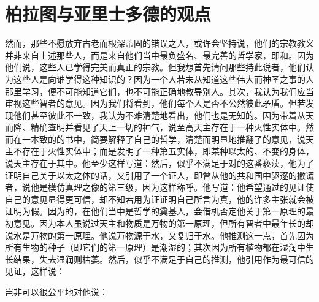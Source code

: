 
\section{柏拉图与亚里士多德的观点}

然而，那些不愿放弃古老而根深蒂固的错误之人，或许会坚持说，他们的宗教教义并非来自上述那些人，而是来自他们当中最负盛名、最完善的哲学家，即和。因为他们说，这些人已学得完美而真正的宗教。但我想首先请问那些持此说者，他们认为这些人是向谁学得这种知识的？因为一个人若未从知道这些伟大而神圣之事的人那里学习，便不可能知道它们，也不可能正确地教导别人。其次，我认为我们应当审视这些智者的意见。因为我们将看到，他们每个人是否不公然彼此矛盾。但若发现他们甚至彼此不一致，我认为不难清楚地看出，他们也是无知的。因为带着从天而降、精确查明并看见了天上一切的神气，说至高天主存在于一种火性实体中。然而在一本致的的书中，简要解释了自己的哲学，清楚而明显地推翻了的意见，说天主不存在于火性实体中；而是发明了一种第五实体，即某种以太的、不变的身体，说天主存在于其中。他至少这样写道：然后，似乎不满足于对的这番亵渎，他为了证明自己关于以太之体的话，又引用了一个证人，即曾从他的共和国中驱逐的撒谎者，说他是模仿真理之像的第三级，因为这样称呼。他写道：他希望通过的见证使自己的意见显得更可信，却不知若用为证证明自己所言为真，他的许多主张就会被证明为假。因为的，在他们当中是哲学的奠基人，会借机否定他关于第一原理的最初意见。因为本人虽说过天主和物质是万物的第一原理，但所有智者中最年长的却说水是万物的第一原理。他说万物源于水，又复归于水。他推测这一点，首先因为所有生物的种子（即它们的第一原理）是潮湿的；其次因为所有植物都在湿润中生长结果，失去湿润则枯萎。然后，似乎不满足于自己的推测，他引用作为最可信的见证，这样说：\par

\par

岂非可以很公平地对他说：\par

